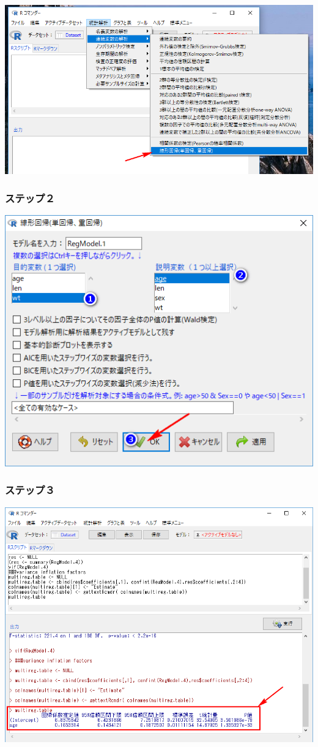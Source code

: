 \documentclass[11pt,]{problemset}
\begin{document}
\begin{center}\includegraphics[width=0.8\linewidth]{pic/lm00} \end{center}

\hypertarget{section-13}{%
\subsubsection{ステップ２}\label{section-13}}

\begin{center}\includegraphics[width=0.6\linewidth]{pic/lm01} \end{center}

\hypertarget{section-14}{%
\subsubsection{ステップ３}\label{section-14}}

\begin{center}\includegraphics[width=0.8\linewidth]{pic/lm02} \end{center}
\end{document}

